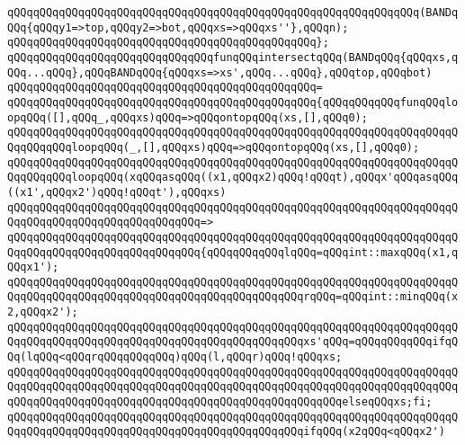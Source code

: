 \newline
\verb|qQQqqQQqqQQqqQQqqQQqqQQqqQQqqQQqqQQqqQQqqQQqqQQqqQQqqQQqqQQqqQQq(BANDqQQq{qQQqy1=>top,qQQqy2=>bot,qQQqxs=>qQQqxs''},qQQqn);|\newline
\verb|qQQqqQQqqQQqqQQqqQQqqQQqqQQqqQQqqQQqqQQqqQQqqQQq};|\newline
\newline
\verb|qQQqqQQqqQQqqQQqqQQqqQQqqQQqqQQqfunqQQqintersectqQQq(BANDqQQq{qQQqxs,qQQq...qQQq},qQQqBANDqQQq{qQQqxs=>xs',qQQq...qQQq},qQQqtop,qQQqbot)|\newline
\verb|qQQqqQQqqQQqqQQqqQQqqQQqqQQqqQQqqQQqqQQqqQQqqQQq=|\newline
\verb|qQQqqQQqqQQqqQQqqQQqqQQqqQQqqQQqqQQqqQQqqQQqqQQq{qQQqqQQqqQQqfunqQQqloopqQQq([],qQQq_,qQQqxs)qQQq=>qQQqontopqQQq(xs,[],qQQq0);|\newline
\verb|qQQqqQQqqQQqqQQqqQQqqQQqqQQqqQQqqQQqqQQqqQQqqQQqqQQqqQQqqQQqqQQqqQQqqQQqqQQqqQQqloopqQQq(_,[],qQQqxs)qQQq=>qQQqontopqQQq(xs,[],qQQq0);|\newline
\verb|qQQqqQQqqQQqqQQqqQQqqQQqqQQqqQQqqQQqqQQqqQQqqQQqqQQqqQQqqQQqqQQqqQQqqQQqqQQqqQQqloopqQQq(xqQQqasqQQq((x1,qQQqx2)qQQq!qQQqt),qQQqx'qQQqasqQQq((x1',qQQqx2')qQQq!qQQqt'),qQQqxs)|\newline
\verb|qQQqqQQqqQQqqQQqqQQqqQQqqQQqqQQqqQQqqQQqqQQqqQQqqQQqqQQqqQQqqQQqqQQqqQQqqQQqqQQqqQQqqQQqqQQqqQQqqQQq=>|\newline
\verb|qQQqqQQqqQQqqQQqqQQqqQQqqQQqqQQqqQQqqQQqqQQqqQQqqQQqqQQqqQQqqQQqqQQqqQQqqQQqqQQqqQQqqQQqqQQqqQQqqQQq{qQQqqQQqqQQqlqQQq=qQQqint::maxqQQq(x1,qQQqx1');|\newline
\verb|qQQqqQQqqQQqqQQqqQQqqQQqqQQqqQQqqQQqqQQqqQQqqQQqqQQqqQQqqQQqqQQqqQQqqQQqqQQqqQQqqQQqqQQqqQQqqQQqqQQqqQQqqQQqqQQqqQQqrqQQq=qQQqint::minqQQq(x2,qQQqx2');|\newline
\newline
\verb|qQQqqQQqqQQqqQQqqQQqqQQqqQQqqQQqqQQqqQQqqQQqqQQqqQQqqQQqqQQqqQQqqQQqqQQqqQQqqQQqqQQqqQQqqQQqqQQqqQQqqQQqqQQqqQQqqQQqxs'qQQq=qQQqqQQqqQQqifqQQq(lqQQq<qQQqrqQQqqQQqqQQq)qQQq(l,qQQqr)qQQq!qQQqxs;|\newline
\verb|qQQqqQQqqQQqqQQqqQQqqQQqqQQqqQQqqQQqqQQqqQQqqQQqqQQqqQQqqQQqqQQqqQQqqQQqqQQqqQQqqQQqqQQqqQQqqQQqqQQqqQQqqQQqqQQqqQQqqQQqqQQqqQQqqQQqqQQqqQQqqQQqqQQqqQQqqQQqqQQqqQQqqQQqqQQqqQQqqQQqqQQqqQQqqQQqelseqQQqxs;fi;|\newline
\newline
\verb|qQQqqQQqqQQqqQQqqQQqqQQqqQQqqQQqqQQqqQQqqQQqqQQqqQQqqQQqqQQqqQQqqQQqqQQqqQQqqQQqqQQqqQQqqQQqqQQqqQQqqQQqqQQqqQQqqQQqifqQQq(x2qQQq<qQQqx2')|\newline
